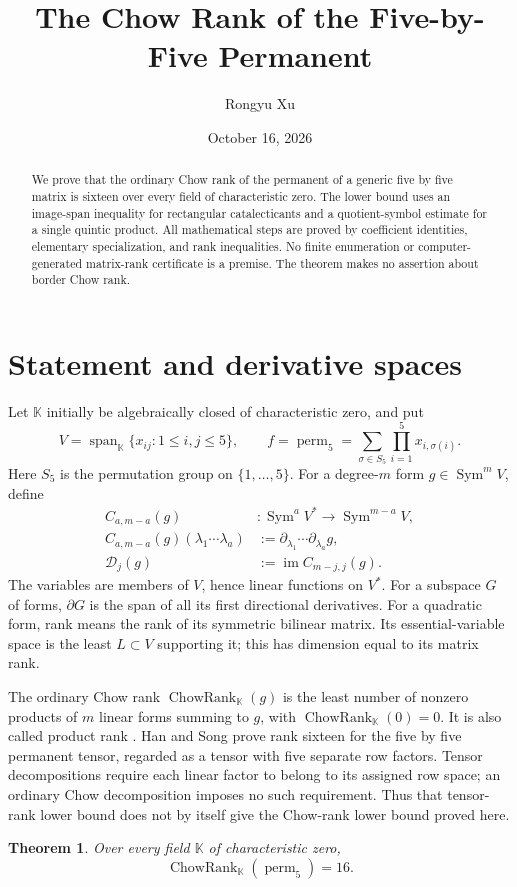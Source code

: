 \documentclass[11pt]{amsart}
\title{The Chow Rank of the Five-by-Five Permanent}
\author{Rongyu Xu}
\date{October 16, 2026}
\newtheorem{theorem}{Theorem}[section]
\theoremstyle{definition}
\numberwithin{equation}{section}
\newcommand{\K}{\mathbb K}
\newcommand{\Sym}{\operatorname{Sym}}
\newcommand{\Span}{\operatorname{span}}
\newcommand{\im}{\operatorname{im}}
\newcommand{\perm}{\operatorname{perm}}
\newcommand{\CR}{\operatorname{ChowRank}}
\newcommand{\cD}{\mathcal D}
\begin{document}
\begin{abstract}
We prove that the ordinary Chow rank of the permanent of a generic five by
five matrix is sixteen over every field of characteristic zero. The lower
bound uses an image-span inequality for rectangular catalecticants and a
quotient-symbol estimate for a single quintic product. All mathematical
steps are proved by coefficient identities, elementary specialization, and
rank inequalities. No finite enumeration or computer-generated matrix-rank
certificate is a premise. The theorem makes no assertion about border Chow
rank.
\end{abstract}
\maketitle

\section{Statement and derivative spaces}
Let \(\K\) initially be algebraically closed of characteristic zero, and put
\[
 V=\Span_{\K}\{x_{ij}:1\le i,j\le5\},\qquad
 f=\perm_5=\sum_{\sigma\in S_5}\prod_{i=1}^5x_{i,\sigma(i)}.
\]
Here \(S_5\) is the permutation group on \(\{1,\ldots,5\}\).
For a degree-\(m\) form \(g\in\Sym^m V\), define
\[
 \begin{aligned}
 C_{a,m-a}(g)&:\Sym^a V^*\longrightarrow\Sym^{m-a}V,\\
 C_{a,m-a}(g)(\lambda_1\cdots\lambda_a)
   &:=\partial_{\lambda_1}\cdots\partial_{\lambda_a}g,\\
 \cD_j(g)&:=\im C_{m-j,j}(g).
 \end{aligned}
\]
The variables are members of \(V\), hence linear functions on \(V^*\).
For a subspace \(G\) of forms, \(\partial G\) is the span of all its
first directional derivatives. For a quadratic form, rank means the rank of
its symmetric bilinear matrix. Its essential-variable space is the least
\(L\subset V\) supporting it; this has dimension equal to its matrix rank.

The ordinary Chow rank \(\CR_{\K}(g)\) is the least number of nonzero
products of \(m\) linear forms summing to \(g\), with \(\CR_{\K}(0)=0\).
It is also called product rank \cite{IltenTeitler2016}.
Han and Song \cite{HanSong2026} prove rank sixteen for the five by five
permanent tensor, regarded as a tensor with five separate row factors.
Tensor decompositions require each linear factor to belong to its assigned
row space; an ordinary Chow decomposition imposes no such requirement.
Thus that tensor-rank lower bound does not by itself give the Chow-rank
lower bound proved here.
\begin{theorem}\label{thm:main}
Over every field \(\K\) of characteristic zero,
\[\CR_{\K}(\perm_5)=16.\]
\end{theorem}
\end{document}

